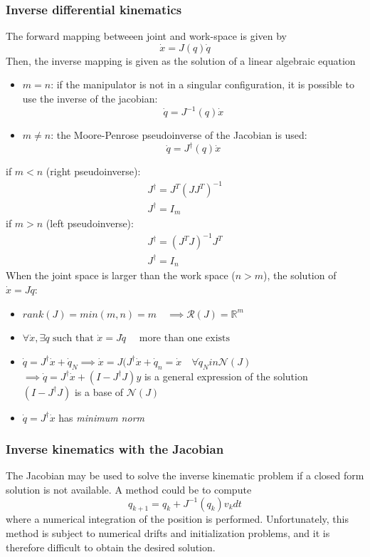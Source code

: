 \documentclass{book}
\begin{document}
\subsubsection{Inverse differential kinematics}
The forward mapping betweeen joint and work-space is given by 
\[
    \dot{x}=J(q)\dot{q}
\]
Then, the inverse mapping is given as the solution of a linear algebraic equation
\begin{itemize}
    \item $m=n$: if the manipulator is not in a singular configuration, it is possible to use the inverse of the jacobian: \[
            \dot{q}=J^{-1}(q)\dot{x}
        \]
    \item $m \neq n$: the Moore-Penrose pseudoinverse of the Jacobian is used:
        \[
            \dot{q}=J^\dagger(q)\dot{x}
        \]
\end{itemize}
if $m<n$ (right pseudoinverse):
\begin{gather*}
    J^\dagger = J^T(JJ^T)^{-1}\\
    J^\dagger=I_m
\end{gather*}
if $m>n$ (left pseudoinverse):
\begin{gather*}
    J^\dagger=(J^T J)^{-1}J^T\\
    J^\dagger=I_n
\end{gather*}
When the joint space is larger than the work space ($n>m$), the solution of $\dot{x}=J\dot{q}$:
\begin{itemize}
    \item $rank(J)=min(m,n)=m \quad \implies \mathcal{R}(J)=\mathbb{R}^m$
    \item $\forall \dot{x}, \exists \dot{q} \text{ such that } \dot{x}=J\dot{q} \quad \text{ more than one exists}$
    \item $\dot{q}=J^\dagger \dot{x}+\dot{q}_N \implies \dot{x}=J(J^\dagger \dot{x} + \dot{q}_n=\dot{x} \quad \forall \dot{q}_N in \mathcal{N}(J)$ \\
        $\implies \dot{q} = J^\dagger \dot{x} + (I-J^\dagger J)y$ is a general expression of the solution
        \\$(I-J^\dagger J)$ is a base of $\mathcal{N}(J)$
    \item $\dot{q}=J^\dagger \dot{x}$ has \emph{minimum norm}
\end{itemize}

\subsubsection{Inverse kinematics with the Jacobian}
The Jacobian may be used to solve the inverse kinematic problem if a closed form solution is not available. A method could be to compute
\[
    q_{k+1}=q_k+J^{-1}(q_k)v_k dt
\]
where a numerical integration of the position is performed. Unfortunately, this method is subject to numerical drifts and initialization problems, and it is therefore difficult to obtain the desired solution. 
\end{document}
